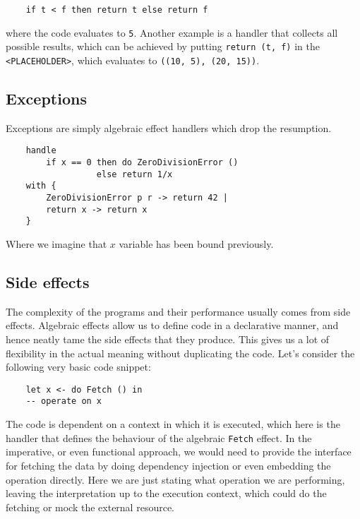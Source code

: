\documentclass{article}
\theoremstyle{definition}
\theoremstyle{lemma}
\theoremstyle{observation}
\theoremstyle{theorem}
\begin{document}
    \begin{verbatim}
    if t < f then return t else return f
    \end{verbatim}
    where the code evaluates to \verb!5!. Another example is a handler that
    collects all possible results, which can be achieved by putting
    \verb!return (t, f)! in the \verb!<PLACEHOLDER>!, which evaluates to \verb!((10, 5), (20, 15))!.

    \subsection{Exceptions}

    Exceptions are simply algebraic effect handlers which drop the resumption.

    \begin{verbatim}
    handle
        if x == 0 then do ZeroDivisionError ()
                  else return 1/x
    with {
        ZeroDivisionError p r -> return 42 |
        return x -> return x
    }
    \end{verbatim}
    Where we imagine that $x$ variable has been bound previously.

    \subsection{Side effects}

    The complexity of the programs and their performance usually comes from side effects.
    Algebraic effects allow us to define code in a declarative manner, and hence
    neatly tame the side effects that they produce. This gives us a lot of flexibility
    in the actual meaning without duplicating the code. Let's consider the following
    very basic code snippet:

    \begin{verbatim}
    let x <- do Fetch () in
    -- operate on x
    \end{verbatim}

    The code is dependent on a context in which it is executed, which here is
    the handler that defines the behaviour of the algebraic \verb!Fetch! effect.
    In the imperative, or even functional approach, we would need to provide
    the interface for fetching the data by doing dependency injection or even
    embedding the operation directly. Here we are just stating what operation
    we are performing, leaving the interpretation up to the execution context,
    which could do the fetching or mock the external resource. \\
\end{document}
